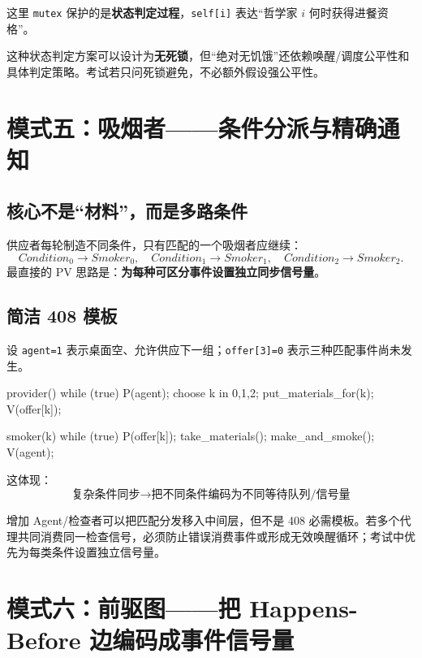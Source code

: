 \documentclass[11pt,a4paper]{ctexart}
\newcommand{\kw}[1]{\textbf{#1}}
\newcommand{\code}[1]{\texttt{#1}}
\begin{document}
这里 \code{mutex} 保护的是\kw{状态判定过程}，\code{self[i]} 表达“哲学家 $i$ 何时获得进餐资格”。

\begin{warn}[不要过度声称]
这种状态判定方案可以设计为\kw{无死锁}，但“绝对无饥饿”还依赖唤醒/调度公平性和具体判定策略。考试若只问死锁避免，不必额外假设强公平性。
\end{warn}

\section{模式五：吸烟者——条件分派与精确通知}

\subsection{核心不是“材料”，而是多路条件}

供应者每轮制造不同条件，只有匹配的一个吸烟者应继续：
\[
Condition_0\to Smoker_0,\quad
Condition_1\to Smoker_1,\quad
Condition_2\to Smoker_2.
\]
最直接的 PV 思路是：\kw{为每种可区分事件设置独立同步信号量}。

\subsection{简洁 408 模板}

设 \code{agent=1} 表示桌面空、允许供应下一组；\code{offer[3]=0} 表示三种匹配事件尚未发生。

\begin{codeblock}
provider() {
    while (true) {
        P(agent);
        choose k in {0,1,2};
        put_materials_for(k);
        V(offer[k]);
    }
}

smoker(k) {
    while (true) {
        P(offer[k]);
        take_materials();
        make_and_smoke();
        V(agent);
    }
}
\end{codeblock}

这体现：
\[
\boxed{\text{复杂条件同步}\to\text{把不同条件编码为不同等待队列/信号量}}
\]

\begin{eng}[关于“代理人模式”]
增加 Agent/检查者可以把匹配分发移入中间层，但不是 408 必需模板。若多个代理共同消费同一检查信号，必须防止错误消费事件或形成无效唤醒循环；考试中优先为每类条件设置独立信号量。
\end{eng}

\section{模式六：前驱图——把 Happens-Before 边编码成事件信号量}
\end{document}
